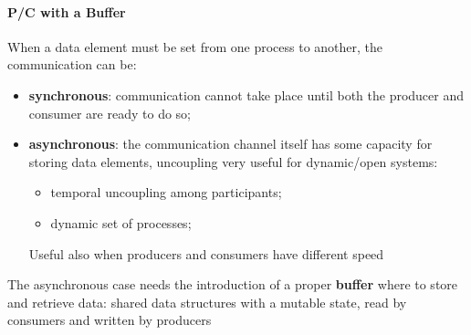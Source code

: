 \paragraph{P/C with a Buffer}\label{par:pi_p_c_with_a_buffer} %
When a data element must be set from one process to another, the communication can be:
\begin{itemize}
    \item \textbf{synchronous}: communication cannot take place until both the producer and consumer are ready to do so;
    \item \textbf{asynchronous}: the communication channel itself has some capacity for storing data elements, uncoupling very useful for dynamic/open systems:
        \begin{itemize}
            \item temporal uncoupling among participants;
            \item dynamic set of processes;
        \end{itemize}
        \begin{note}
            Useful also when producers and consumers have different speed
        \end{note}
\end{itemize}
\begin{warning}
    The asynchronous case needs the introduction of a proper \textbf{buffer} where to store and retrieve data: shared data structures with a mutable state, read by consumers and written by producers
\end{warning}
%

